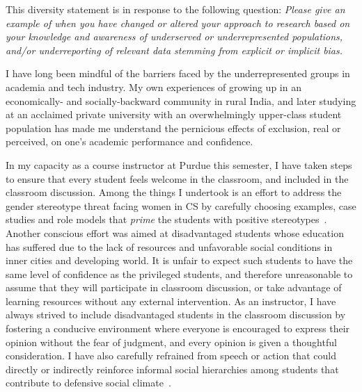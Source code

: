 This diversity statement is in response to the following question:
\emph{Please give an example of when you have changed or altered your
approach to research based on your knowledge and awareness of
underserved or underrepresented populations, and/or underreporting of
relevant data stemming from explicit or implicit bias.}

I have long been mindful of the barriers faced by the underrepresented
groups in academia and tech industry. My own experiences of growing up
in an economically- and socially-backward community in rural India,
and later studying at an acclaimed private university with an
overwhelmingly upper-class student population has made me understand
the pernicious effects of exclusion, real or perceived, on one's
academic performance and confidence. 

In my capacity as a course instructor at Purdue this semester, I have
taken steps to ensure that every student feels welcome in the
classroom, and included in the classroom discussion. Among the things
I undertook is an effort to address the gender stereotype threat
facing women in CS by carefully choosing examples, case studies and
role models that \emph{prime} the students with positive
stereotypes~\cite{MA07,SG11}.  Another conscious effort was aimed at
disadvantaged students whose education has suffered due to the lack of
resources and unfavorable social conditions in inner cities and
developing world. It is unfair to expect such students to have the
same level of confidence as the privileged students, and therefore
unreasonable to assume that they will participate in classroom
discussion, or take advantage of learning resources without any
external intervention. As an instructor, I have always strived to
include disadvantaged students in the classroom discussion by
fostering a conducive environment where everyone is encouraged to
express their opinion without the fear of judgment, and every opinion
is given a thoughtful consideration. I have also carefully refrained
from speech or action that could directly or indirectly reinforce
informal social hierarchies among students that contribute to
defensive social climate~\cite{BGJ02}. 

